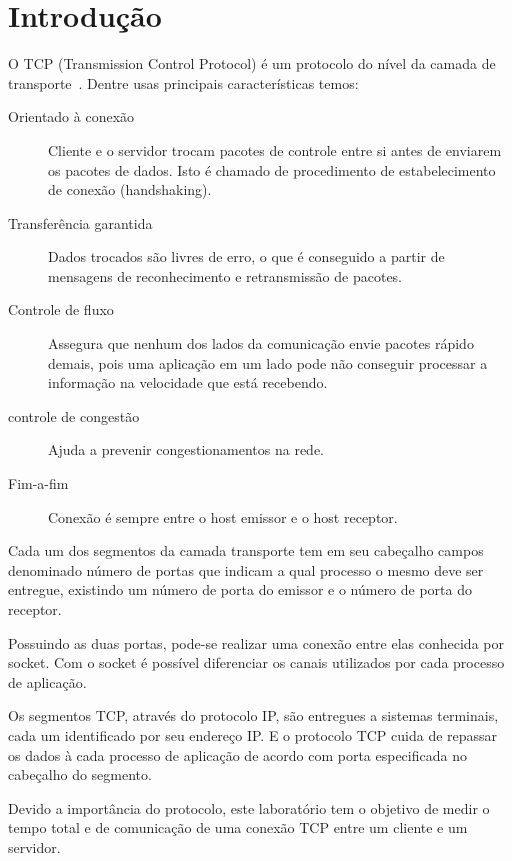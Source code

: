 \documentclass[10pt,a4paper]{article}
\begin{document}
\section{Introdução}
O TCP (Transmission Control Protocol) é um protocolo do nível da
camada de transporte~\cite{Kurose05}. Dentre usas principais características temos:
\begin{description}
\item[Orientado à conexão]  Cliente e o servidor trocam pacotes de
controle entre si antes de enviarem os pacotes de dados. Isto é chamado de procedimento de
estabelecimento de conexão (handshaking). 
\item[Transferência garantida] Dados trocados são livres de erro, o que é conseguido a partir de
mensagens de reconhecimento e retransmissão de pacotes. 
\item[Controle de fluxo] Assegura que nenhum dos lados da comunicação envie pacotes rápido demais, pois uma aplicação em um
lado pode não conseguir processar a informação na velocidade que está
recebendo.
\item[controle de congestão] Ajuda a prevenir congestionamentos na
  rede.
\item[Fim-a-fim ] Conexão é sempre entre o host emissor e o host receptor.

\end{description}

Cada um dos segmentos da camada transporte tem em seu cabeçalho campos
denominado número de portas que indicam a qual processo o mesmo deve
ser entregue, existindo um número de porta do emissor e o número de porta do
receptor. 

Possuindo as duas portas, pode-se realizar uma conexão entre elas
conhecida por socket. Com o socket é possível diferenciar os canais
utilizados por cada processo de aplicação.

Os segmentos TCP, através do protocolo IP, são entregues a sistemas terminais, cada um
identificado por seu endereço IP. E o protocolo TCP cuida de repassar
os dados à cada processo de aplicação de acordo com porta especificada no
cabeçalho do segmento.

Devido a importância do protocolo, este laboratório tem o objetivo de
medir o tempo total e de comunicação de uma conexão TCP entre um
cliente e um servidor.

\end{document}
